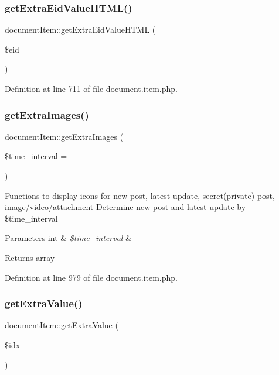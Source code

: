 \subsubsection{\texorpdfstring{get\+Extra\+Eid\+Value\+H\+T\+M\+L()}{getExtraEidValueHTML()}}
{\footnotesize\ttfamily document\+Item\+::get\+Extra\+Eid\+Value\+H\+T\+ML (\begin{DoxyParamCaption}\item[{}]{\$eid }\end{DoxyParamCaption})}



Definition at line 711 of file document.\+item.\+php.

\hypertarget{classdocumentItem_a0f72df4345359453aa01ff1490071c5a}{}\label{classdocumentItem_a0f72df4345359453aa01ff1490071c5a} 
\subsubsection{\texorpdfstring{get\+Extra\+Images()}{getExtraImages()}}
{\footnotesize\ttfamily document\+Item\+::get\+Extra\+Images (\begin{DoxyParamCaption}\item[{}]{\$time\+\_\+interval = {} }\end{DoxyParamCaption})}

Functions to display icons for new post, latest update, secret(private) post, image/video/attachment Determine new post and latest update by \$time\+\_\+interval 
\begin{DoxyParams}[1]{Parameters}
int & {\em \$time\+\_\+interval} & \\
\hline
\end{DoxyParams}
\begin{DoxyReturn}{Returns}
array 
\end{DoxyReturn}


Definition at line 979 of file document.\+item.\+php.

\hypertarget{classdocumentItem_a5b0cd52819bcb058a7e8a6764aef79d1}{}\label{classdocumentItem_a5b0cd52819bcb058a7e8a6764aef79d1} 
\subsubsection{\texorpdfstring{get\+Extra\+Value()}{getExtraValue()}}
{\footnotesize\ttfamily document\+Item\+::get\+Extra\+Value (\begin{DoxyParamCaption}\item[{}]{\$idx }\end{DoxyParamCaption})}



